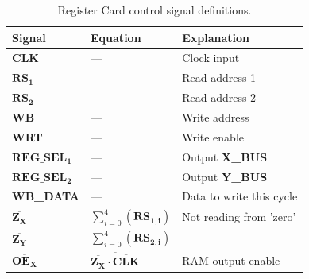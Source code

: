 \documentclass[a4paper, 11pt]{article}
\begin{document}
            \begin{table}[htb!]
                \centering
                \renewcommand{\arraystretch}{1.5}
                \caption{Register Card control signal definitions.}
                \label{tab:Regs:TheoryOp:LogicTab}
                \begin{tabularx}{\textwidth}{
                        >{\hsize=0.2\hsize\raggedright\arraybackslash}X
                        >{\hsize=0.4\hsize\raggedright\arraybackslash}X
                        >{\hsize=0.4\hsize\raggedright\arraybackslash}X
                    }
                    \toprule
                    Signal                      &Equation   &Explanation                \\
                    \midrule\addlinespace
                    \textbf{CLK}                &---        &Clock input                \\
                    \(\mathbf{RS_{1}}\)         &---        &Read address 1             \\
                    \(\mathbf{RS_{2}}\)         &---        &Read address 2             \\
                    \(\mathbf{WB}\)             &---        &Write address              \\
                    \textbf{WRT}                &---        &Write enable               \\
                    \(\mathbf{REG\_SEL_{1}}\)   &---        &Output \textbf{X\_BUS}     \\
                    \(\mathbf{REG\_SEL_{2}}\)   &---        &Output \textbf{Y\_BUS}     \\
                    \textbf{WB\_DATA}           &---        &Data to write this cycle   \\
                    \midrule\addlinespace
                    
                     \(\mathbf{\overline{Z_{X}}}\)   
                    &\(\sum_{i=0}^{4}\left(\mathbf{RS_{1,i}}\right)\)
                    &Not reading from 'zero'\\

                      \(\mathbf{\overline{Z_{Y}}}\)   
                    &\(\sum_{i=0}^{4}\left(\mathbf{RS_{2,i}}\right)\)
                    &\\

                     \(\mathbf{\overline{OE_{X}}}\)   
                    &\(\overline{\mathbf{\overline{Z_{X}}} \cdot \mathbf{\overline{CLK}}}\)
                    &RAM output enable\\


\end{tabularx}
\end{table}
\end{document}
